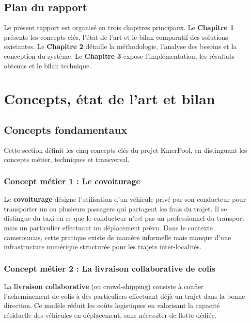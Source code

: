 \documentclass[12pt, a4paper]{report}
\begin{document}
\section*{Plan du rapport}
Le présent rapport est organisé en trois chapitres principaux. Le \textbf{Chapitre 1}
présente les concepts clés, l'état de l'art et le bilan comparatif des solutions
existantes. Le \textbf{Chapitre 2} détaille la méthodologie, l'analyse des besoins et
la conception du système. Le \textbf{Chapitre 3} expose l'implémentation, les résultats
obtenus et le bilan technique.

\chapter{Concepts, état de l'art et bilan}

\section{Concepts fondamentaux}

Cette section définit les cinq concepts clés du projet KmerPool, en distinguant les
concepts métier, techniques et transversal.

\subsection{Concept métier 1 : Le covoiturage}

Le \textbf{covoiturage} désigne l'utilisation d'un véhicule privé par son conducteur pour
transporter un ou plusieurs passagers qui partagent les frais du trajet. Il se distingue
du taxi en ce que le conducteur n'est pas un professionnel du transport mais un
particulier effectuant un déplacement prévu. Dans le contexte camerounais, cette
pratique existe de manière informelle mais manque d'une infrastructure numérique
structurée pour les trajets inter-localités.

\subsection{Concept métier 2 : La livraison collaborative de colis}

La \textbf{livraison collaborative} (ou crowd-shipping) consiste à confier l'acheminement
de colis à des particuliers effectuant déjà un trajet dans la bonne direction. Ce modèle
réduit les coûts logistiques en valorisant la capacité résiduelle des véhicules en
déplacement, sans nécessiter de flotte dédiée.
\end{document}

